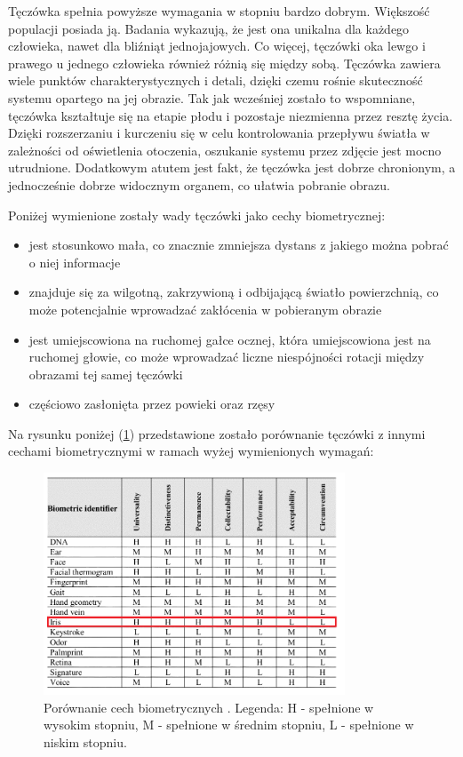 Tęczówka spełnia powyższe wymagania w stopniu bardzo dobrym. Większoś\'c populacji posiada
ją. Badania wykazują, że jest ona unikalna dla każdego człowieka, nawet dla bli\'zniąt jednojajowych.
Co więcej, tęczówki oka lewgo i prawego u jednego człowieka również różnią się między sobą. Tęczówka zawiera
wiele punktów charakterystycznych i detali, dzięki czemu rośnie skutecznoś\'c systemu opartego na jej obrazie.
Tak jak wcześniej zostało to wspomniane, tęczówka kształtuje się na etapie płodu i pozostaje niezmienna
przez resztę życia. Dzięki rozszerzaniu i kurczeniu się w celu kontrolowania przepływu światła w zależności
od oświetlenia otoczenia, oszukanie systemu przez zdjęcie jest mocno utrudnione. Dodatkowym atutem
jest fakt, że tęczówka jest dobrze chronionym, a jednocześnie dobrze widocznym organem, co ułatwia
pobranie obrazu.

Poniżej wymienione zostały wady tęczówki jako cechy biometrycznej:

\begin{itemize}
  \item jest stosunkowo mała, co znacznie zmniejsza dystans z jakiego można pobra\'c o niej informacje
  \item znajduje się za wilgotną, zakrzywioną i odbijającą światło powierzchnią, co może potencjalnie
  wprowadza\'c zakłócenia w pobieranym obrazie
  \item jest umiejscowiona na ruchomej gałce ocznej, która umiejscowiona jest na ruchomej głowie, co może
  wprowadza\'c liczne niespójności rotacji między obrazami tej samej tęczówki
  \item częściowo zasłonięta przez powieki oraz rzęsy
\end{itemize}

Na rysunku poniżej (\ref{fig:irisBiometricsComparison}) przedstawione zostało porównanie tęczówki
z innymi cechami biometrycznymi w ramach wyżej wymienionych wymagań:

\begin{figure}[ht]
  \centering
  \includegraphics[width=0.8\textwidth]{images/intro/biometricsProperties.png}
  \caption{Porównanie cech biometrycznych \cite{IntroToBiometricRecognition}. Legenda: H - spełnione w wysokim
  stopniu, M - spełnione w średnim stopniu, L - spełnione w niskim stopniu.}
  \label{fig:irisBiometricsComparison}
\end{figure}

